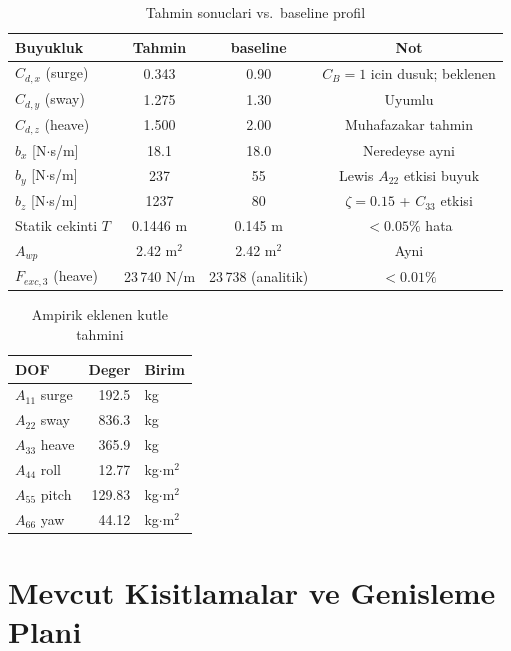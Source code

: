 \documentclass[12pt,a4paper]{article}
\begin{document}
\begin{table}[H]
  \centering
  \caption{Tahmin sonuclari vs.\ baseline profil}
  \begin{tabular}{lccc}
    \toprule
    \textbf{Buyukluk} & \textbf{Tahmin} & \textbf{baseline} & \textbf{Not} \\
    \midrule
    $C_{d,x}$ (surge) & 0.343 & 0.90 & $C_B{=}1$ icin dusuk; beklenen \\
    $C_{d,y}$ (sway)  & 1.275 & 1.30 & Uyumlu \\
    $C_{d,z}$ (heave) & 1.500 & 2.00 & Muhafazakar tahmin \\
    $b_x$ [N$\cdot$s/m] & 18.1 & 18.0 & Neredeyse ayni \\
    $b_y$ [N$\cdot$s/m] & 237  & 55   & Lewis $A_{22}$ etkisi buyuk \\
    $b_z$ [N$\cdot$s/m] & 1237 & 80   & $\zeta{=}0.15$ + $C_{33}$ etkisi \\
    \midrule
    Statik cekinti $T$ & 0.1446 m & 0.145 m & $<0.05\%$ hata \\
    $A_{wp}$ & 2.42 m$^2$ & 2.42 m$^2$ & Ayni \\
    $F_{exc,3}$ (heave) & 23\,740 N/m & 23\,738 (analitik) & $<0.01\%$ \\
    \bottomrule
  \end{tabular}
\end{table}

\begin{table}[H]
  \centering
  \caption{Ampirik eklenen kutle tahmini}
  \begin{tabular}{lrl}
    \toprule
    \textbf{DOF} & \textbf{Deger} & \textbf{Birim} \\
    \midrule
    $A_{11}$ surge  & 192.5  & kg \\
    $A_{22}$ sway   & 836.3  & kg \\
    $A_{33}$ heave  & 365.9  & kg \\
    $A_{44}$ roll   & 12.77  & kg$\cdot$m$^2$ \\
    $A_{55}$ pitch  & 129.83 & kg$\cdot$m$^2$ \\
    $A_{66}$ yaw    & 44.12  & kg$\cdot$m$^2$ \\
    \bottomrule
  \end{tabular}
\end{table}

\section{Mevcut Kisitlamalar ve Genisleme Plani}
\end{document}
